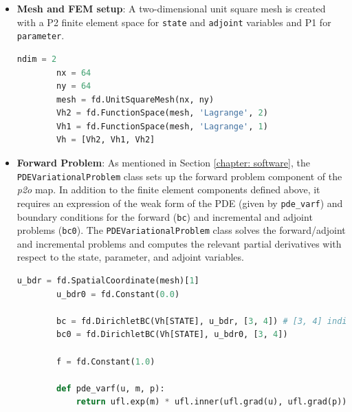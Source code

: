 \begin{itemize}
    \item \textbf{Mesh and FEM setup}: A two-dimensional unit square mesh is created with a P2 finite element space for \texttt{state} and \texttt{adjoint} variables and P1 for \texttt{parameter}.
    \begin{lstlisting}[language=python]
        ndim = 2
        nx = 64
        ny = 64
        mesh = fd.UnitSquareMesh(nx, ny)
        Vh2 = fd.FunctionSpace(mesh, 'Lagrange', 2)
        Vh1 = fd.FunctionSpace(mesh, 'Lagrange', 1)
        Vh = [Vh2, Vh1, Vh2]
    \end{lstlisting}
    \item \textbf{Forward Problem}: As mentioned in Section \ref{chapter: software}, the \texttt{PDEVariationalProblem} class sets up the forward problem component of the \textit{p2o} map. In addition to the finite element components defined above, it requires an expression of the weak form of the PDE (given by \texttt{pde\_varf}) and boundary conditions for the forward (\texttt{bc}) and incremental and adjoint problems (\texttt{bc0}).
    The \texttt{PDEVariationalProblem} class solves the forward/adjoint and incremental problems and computes the relevant partial derivatives with respect to the state, parameter, and adjoint variables.
    \begin{lstlisting}[language=python]
        u_bdr = fd.SpatialCoordinate(mesh)[1]
        u_bdr0 = fd.Constant(0.0)

        bc = fd.DirichletBC(Vh[STATE], u_bdr, [3, 4]) # [3, 4] indicates that bc is applied to y == 0 amd y ==1
        bc0 = fd.DirichletBC(Vh[STATE], u_bdr0, [3, 4])

        f = fd.Constant(1.0)

        def pde_varf(u, m, p):
            return ufl.exp(m) * ufl.inner(ufl.grad(u), ufl.grad(p)) * ufl.dx - f * p * ufl.dx


\end{lstlisting}
\end{itemize}

